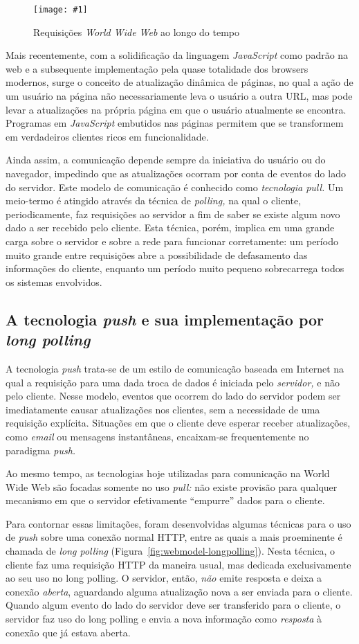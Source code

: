 \documentclass[ruledheader, 12pt]{abnt}
\newcommand{\figcustom}[4]{\par
	\begin{figure}[#3]
		\centering
		\texttt{[image: \#1]}
		\caption{\label{fig:#1}#2}
	\end{figure}
\par}
\newcommand{\figref}[1]{(Figura~\ref{fig:#1})}
\begin{document}
\figcustom{webmodel-pull}{Requisições \emph{World Wide Web} ao longo do tempo}{bp}{.8}

Mais recentemente, com a solidificação da linguagem \emph{JavaScript} como padrão na web e a subsequente implementação pela quase totalidade dos browsers modernos, surge o conceito de atualização dinâmica de páginas, no qual a ação de um usuário na página não necessariamente leva o usuário a outra URL, mas pode levar a atualizações na própria página em que o usuário atualmente se encontra. Programas em \emph{JavaScript} embutidos nas páginas permitem que se transformem em verdadeiros clientes ricos em funcionalidade.

Ainda assim, a comunicação depende sempre da iniciativa do usuário ou do navegador, impedindo que as atualizações ocorram por conta de eventos do lado do servidor. Este modelo de comunicação é conhecido como \emph{tecnologia pull.} Um meio-termo é atingido através da técnica de \emph{polling,} na qual o cliente, periodicamente, faz requisições ao servidor a fim de saber se existe algum novo dado a ser recebido pelo cliente. Esta técnica, porém, implica em uma grande carga sobre o servidor e sobre a rede para funcionar corretamente: um período muito grande entre requisições abre a possibilidade de defasamento das informações do cliente, enquanto um período muito pequeno sobrecarrega todos os sistemas envolvidos.

\subsection{A tecnologia \emph{push} e sua implementação por \emph{long polling}}

A tecnologia \emph{push} trata-se de um estilo de comunicação baseada em Internet na qual a requisição para uma dada troca de dados é iniciada pelo \emph{servidor,} e não pelo cliente. Nesse modelo, eventos que ocorrem do lado do servidor podem ser imediatamente causar atualizações nos clientes, sem a necessidade de uma requisição explícita. Situações em que o cliente deve esperar receber atualizações, como \emph{email} ou mensagens instantâneas, encaixam-se frequentemente no paradigma \emph{push.}

Ao mesmo tempo, as tecnologias hoje utilizadas para comunicação na World Wide Web são focadas somente no uso \emph{pull:} não existe provisão para qualquer mecanismo em que o servidor efetivamente ``empurre'' dados para o cliente.

Para contornar essas limitações, foram desenvolvidas algumas técnicas para o uso de \emph{push} sobre uma conexão normal HTTP, entre as quais a mais proeminente é chamada de \emph{long polling} \figref{webmodel-longpolling}. Nesta técnica, o cliente faz uma requisição HTTP da maneira usual, mas dedicada exclusivamente ao seu uso no long polling. O servidor, então, \emph{não} emite resposta e deixa a conexão \emph{aberta}, aguardando alguma atualização nova a ser enviada para o cliente. Quando algum evento do lado do servidor deve ser transferido para o cliente, o servidor faz uso do long polling e envia a nova informação como \emph{resposta} à conexão que já estava aberta.
\end{document}

